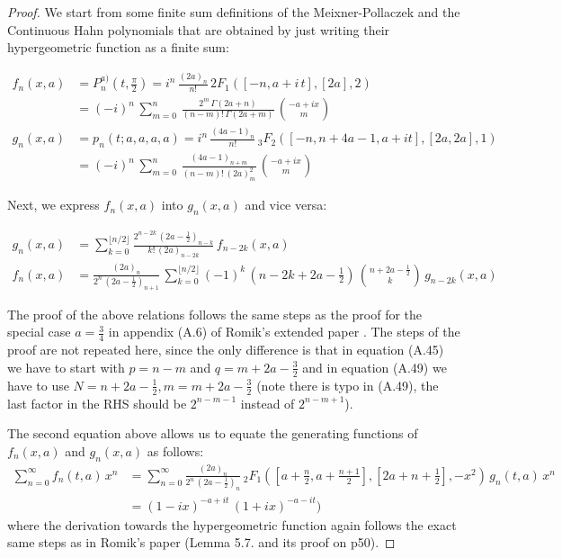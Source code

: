\documentclass[a4paper,11pt,twoside]{amsart}
\begin{document}
\begin{proof}
We start from some finite sum definitions of the Meixner-Pollaczek and the Continuous Hahn polynomials that are obtained by just writing their hypergeometric function as a finite sum:

\begin{align}
 f_n(x,a) &= P_n^{a)}\left(t,\frac{\pi}{2}\right) = i^n\,\frac{(2a)_n}{n!}\,{}2F_1\left([-n, a+i\,t],[2a],2\right) \\
 &= (-i)^n\,\sum_{m=0}^n\,\frac{2^m\,\Gamma(2a+n)}{(n-m)!\,\Gamma(2a+m)}\,\binom{-a+ix}{m} \\
 g_n(x,a) &= p_n(t;a,a,a,a) = i^n\,\frac{(4a-1)_n}{n!}\, {}_3F_2([-n, n+ 4a-1,a+it], [2a, 2a], 1) \\
 &= (-i)^n\,\sum_{m=0}^n\,\frac{(4a-1)_{n+m}}{(n-m)!\,(2a)_m^2}\,\binom{-a+ix}{m}
\end{align}

Next, we express $f_n(x,a)$ into $g_n(x,a)$ and vice versa:

\begin{align}
g_n(x,a) &= \sum_{k=0}^{\lfloor n/2\rfloor} \frac{2^{n-2k}\,\left(2a-\frac12\right)_{n-k}}{k!\,(2a)_{n-2k}}\,f_{n-2k}(x,a) \\
f_n(x,a) &= \frac{(2a)_n}{2^n\,\left(2a-\frac12\right)_{n+1}}\,\sum_{k=0}^{\lfloor n/2\rfloor} (-1)^k\,\left(n-2k+2a-\frac12\right)\,\binom{n+2a-\frac12}{k}\,g_{n-2k}(x,a)
\end{align}

The proof of the above relations follows the same steps as the proof for the special case $a=\frac34$ in appendix (A.6) of Romik's extended paper \cite{rom}. The steps of the proof are not repeated here, since the only difference is that in equation (A.45) we have to start with $p=n-m$ and $q=m+2a-\frac32$ and in equation (A.49) we have to use $N=n + 2a - \frac12, m=m +2a-\frac32$ (note there is typo in (A.49), the last factor in the RHS should be $2^{n-m-1}$ instead of $2^{n-m+1}$).

The second equation above allows us to equate the generating functions of $f_n(x,a)$ and $g_n(x,a)$ as follows:
\begin{align}
 \sum_{n=0}^\infty f_n(t,a)\,x^n &= \sum_{n=0}^\infty \frac{(2a)_n}{2^n\,\left(2a-\frac12\right)_n}\,{}_2F_1\left(\left[a+\frac{n}{2}, a+\frac{n+1}{2}\right],\left[2a+n+\frac12\right],-x^2\right) \,g_n(t,a)\,x^n \\
 &= (1-ix)^{-a+it}\,(1+ix)^{-a-it})
\end{align}
where the derivation towards the hypergeometric function again follows the exact same steps as in Romik's paper (Lemma 5.7. and its proof on p50). 


\end{proof}
\end{document}
